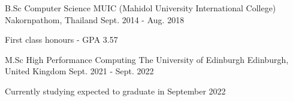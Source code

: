 

\begin{cventries}

  \cventry
    {B.Sc Computer Science} %
    {MUIC (Mahidol University International College)} %
    {Nakornpathom, Thailand} %
    {Sept. 2014 - Aug. 2018} %
    {
      \begin{cvitems} %
        \item {First class honours - GPA 3.57}
      \end{cvitems}
    }

  \cventry
    {M.Sc High Performance Computing} %
    {The University of Edinburgh} %
    {Edinburgh, United Kingdom} %
    {Sept. 2021 - Sept. 2022} %
    {
      \begin{cvitems} %
        \item {Currently studying expected to graduate in September 2022}
      \end{cvitems}
    }
    

\end{cventries}
